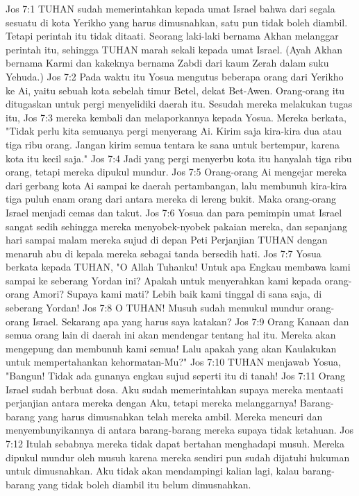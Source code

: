 Jos 7:1  TUHAN sudah memerintahkan kepada umat Israel bahwa dari segala sesuatu di kota Yerikho yang harus dimusnahkan, satu pun tidak boleh diambil. Tetapi perintah itu tidak ditaati. Seorang laki-laki bernama Akhan melanggar perintah itu, sehingga TUHAN marah sekali kepada umat Israel. (Ayah Akhan bernama Karmi dan kakeknya bernama Zabdi dari kaum Zerah dalam suku Yehuda.)
Jos 7:2  Pada waktu itu Yosua mengutus beberapa orang dari Yerikho ke Ai, yaitu sebuah kota sebelah timur Betel, dekat Bet-Awen. Orang-orang itu ditugaskan untuk pergi menyelidiki daerah itu. Sesudah mereka melakukan tugas itu,
Jos 7:3  mereka kembali dan melaporkannya kepada Yosua. Mereka berkata, "Tidak perlu kita semuanya pergi menyerang Ai. Kirim saja kira-kira dua atau tiga ribu orang. Jangan kirim semua tentara ke sana untuk bertempur, karena kota itu kecil saja."
Jos 7:4  Jadi yang pergi menyerbu kota itu hanyalah tiga ribu orang, tetapi mereka dipukul mundur.
Jos 7:5  Orang-orang Ai mengejar mereka dari gerbang kota Ai sampai ke daerah pertambangan, lalu membunuh kira-kira tiga puluh enam orang dari antara mereka di lereng bukit. Maka orang-orang Israel menjadi cemas dan takut.
Jos 7:6  Yosua dan para pemimpin umat Israel sangat sedih sehingga mereka menyobek-nyobek pakaian mereka, dan sepanjang hari sampai malam mereka sujud di depan Peti Perjanjian TUHAN dengan menaruh abu di kepala mereka sebagai tanda bersedih hati.
Jos 7:7  Yosua berkata kepada TUHAN, "O Allah Tuhanku! Untuk apa Engkau membawa kami sampai ke seberang Yordan ini? Apakah untuk menyerahkan kami kepada orang-orang Amori? Supaya kami mati? Lebih baik kami tinggal di sana saja, di seberang Yordan!
Jos 7:8  O TUHAN! Musuh sudah memukul mundur orang-orang Israel. Sekarang apa yang harus saya katakan?
Jos 7:9  Orang Kanaan dan semua orang lain di daerah ini akan mendengar tentang hal itu. Mereka akan mengepung dan membunuh kami semua! Lalu apakah yang akan Kaulakukan untuk mempertahankan kehormatan-Mu?"
Jos 7:10  TUHAN menjawab Yosua, "Bangun! Tidak ada gunanya engkau sujud seperti itu di tanah!
Jos 7:11  Orang Israel sudah berbuat dosa. Aku sudah memerintahkan supaya mereka mentaati perjanjian antara mereka dengan Aku, tetapi mereka melanggarnya! Barang-barang yang harus dimusnahkan telah mereka ambil. Mereka mencuri dan menyembunyikannya di antara barang-barang mereka supaya tidak ketahuan.
Jos 7:12  Itulah sebabnya mereka tidak dapat bertahan menghadapi musuh. Mereka dipukul mundur oleh musuh karena mereka sendiri pun sudah dijatuhi hukuman untuk dimusnahkan. Aku tidak akan mendampingi kalian lagi, kalau barang-barang yang tidak boleh diambil itu belum dimusnahkan.
